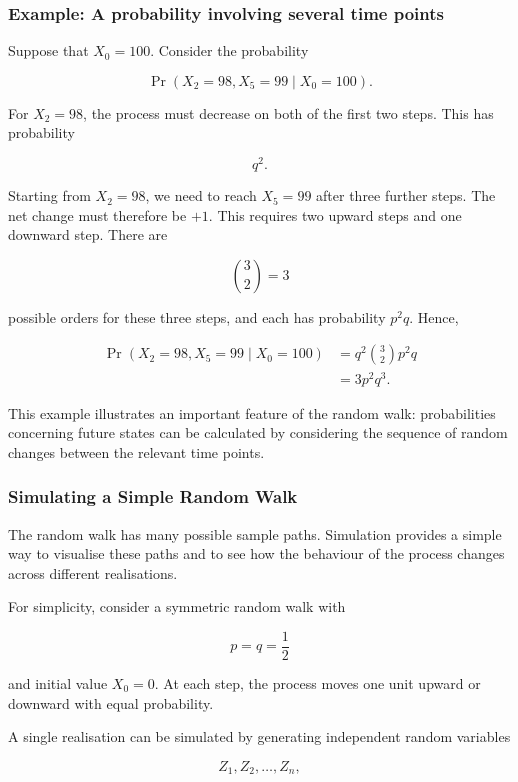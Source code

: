 \documentclass[
  letterpaper,
  DIV=11,
  numbers=noendperiod]{scrartcl}
\theoremstyle{definition}
\theoremstyle{remark}
\begin{document}
\subsubsection{Example: A probability involving several time
points}\label{example-a-probability-involving-several-time-points}

Suppose that \(X_0=100\). Consider the probability

\[
\Pr(X_2=98,X_5=99\mid X_0=100).
\]

For \(X_2=98\), the process must decrease on both of the first two
steps. This has probability

\[
q^2.
\]

Starting from \(X_2=98\), we need to reach \(X_5=99\) after three
further steps. The net change must therefore be \(+1\). This requires
two upward steps and one downward step. There are

\[
{3\choose2}=3
\]

possible orders for these three steps, and each has probability
\(p^2q\). Hence,

\[
\begin{aligned}
\Pr(X_2=98,X_5=99\mid X_0=100)
&=q^2{3\choose2}p^2q\\
&=3p^2q^3.
\end{aligned}
\]

This example illustrates an important feature of the random walk:
probabilities concerning future states can be calculated by considering
the sequence of random changes between the relevant time points.

\subsubsection{Simulating a Simple Random
Walk}\label{simulating-a-simple-random-walk}

The random walk has many possible sample paths. Simulation provides a
simple way to visualise these paths and to see how the behaviour of the
process changes across different realisations.

For simplicity, consider a symmetric random walk with

\[
p=q=\frac12
\]

and initial value \(X_0=0\). At each step, the process moves one unit
upward or downward with equal probability.

A single realisation can be simulated by generating independent random
variables

\[
Z_1,Z_2,\ldots,Z_n,
\]
\end{document}
